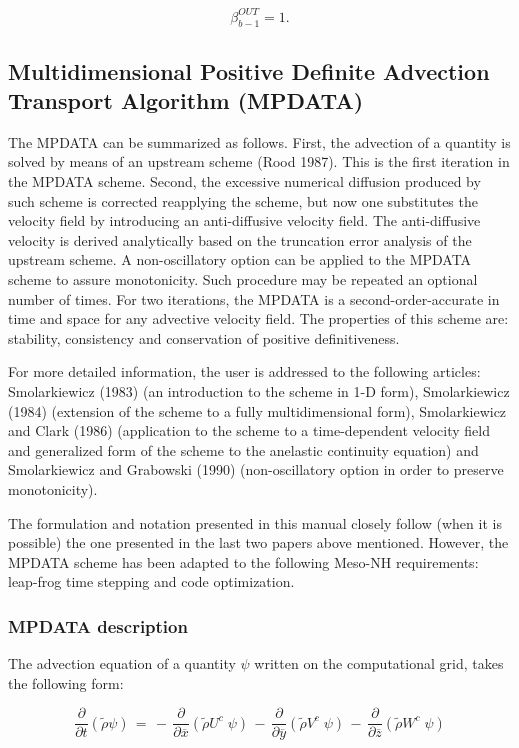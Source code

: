\begin{equation}
\beta^{OUT}_{b-1}=1.
\end{equation}

\subsection{Multidimensional Positive Definite Advection Transport Algorithm (MPDATA)}

The MPDATA can be summarized as follows.
First, the advection of a quantity is solved by means of an upstream scheme
(Rood 1987). This is the first iteration in the MPDATA scheme.
Second, the excessive numerical diffusion produced by such scheme is
corrected reapplying the scheme, but now one substitutes the velocity field by
introducing an
anti-diffusive velocity field. The anti-diffusive velocity is derived analytically
based on the truncation error analysis of the upstream scheme.
A non-oscillatory option can be applied to the MPDATA scheme to assure monotonicity.
Such procedure may be repeated an optional number
of times. For two iterations, the  MPDATA is a second-order-accurate in time
and space for any
advective velocity field.
The properties
of this scheme are: stability, consistency and conservation of positive
definitiveness.

For more detailed information, the user is addressed to the following articles:
Smolarkiewicz (1983) (an introduction to the scheme in 1-D form), Smolarkiewicz
(1984) (extension of the scheme to a fully multidimensional form), Smolarkiewicz
and Clark (1986) (application to the scheme to a time-dependent velocity field
and generalized form of the scheme
to the anelastic continuity equation) and Smolarkiewicz and
Grabowski (1990) (non-oscillatory option in order to preserve monotonicity).

The formulation and notation presented in this manual closely follow (when
it is possible) the one
presented in the last two papers above mentioned. However, the MPDATA scheme
has been adapted to the following Meso-NH requirements: leap-frog time stepping and
code optimization.

\subsubsection{MPDATA description}

The advection equation of a quantity $\psi$ written on the computational
grid, takes the following form:

\begin{equation}
\dfrac{\partial}{\partial t}(\tilde{\rho}\psi) \, =
 \, - \, \dfrac{\partial }{\partial \overline{x}} (\tilde{\rho} U^{c} \;  \psi)
 \, - \, \dfrac{\partial }{\partial \overline{y}} (\tilde{\rho} V^{c} \;  \psi)
 \, - \, \dfrac{\partial }{\partial \overline{z}} (\tilde{\rho} W^{c} \;  \psi)
\end{equation}

